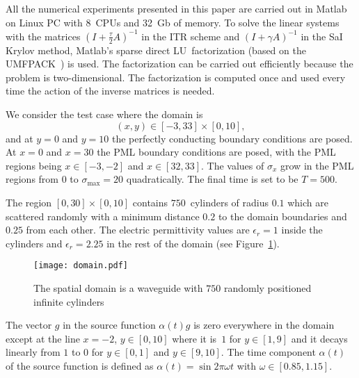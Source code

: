 \documentclass[11pt]{elsarticle}
\begin{document}
All the numerical experiments presented in this paper are carried
out in Matlab on Linux PC with 8~CPUs and 32~Gb of memory.
To solve the linear systems with the matrices $(I+\frac\tau2 A)^{-1}$
in the ITR scheme  
and $(I+\gamma A)^{-1}$ in the SaI Krylov method,
Matlab's sparse direct LU~factorization (based on the 
UMFPACK~\cite{UMFPACK2}) is used.
The factorization can be carried out efficiently because the
problem is two-dimensional.
The factorization is computed once and used every time the action
of the inverse matrices is needed.

We consider the test case where the domain is
$$
(x,y)\in [-3,33]\times [0,10],
$$
and at $y=0$ and $y=10$ the perfectly conducting
boundary conditions are posed.  At $x=0$ and $x=30$
the PML boundary conditions are posed, with the PML
regions being $x\in[-3,-2]$ and $x\in[32,33]$.
The values of $\sigma_{x}$ grow in the PML regions 
from $0$ to $\sigma_{\max}=20$ quadratically. 
The final time is set to be $T=500$.

The region $[0,30]\times [0,10]$ contains $750$~cylinders 
of radius $0.1$ which are scattered randomly with
a minimum distance $0.2$ to the domain boundaries and 
$0.25$ from each other.  The electric permittivity
values are  
$\epsilon_r=1$ inside the cylinders and $\epsilon_r=2.25$ in the rest
of the domain (see Figure~\ref{fig:dom}).

\begin{figure}
\texttt{[image: domain.pdf]}
\caption{The spatial domain is a waveguide with $750$ randomly positioned 
infinite cylinders}  
\label{fig:dom}
\end{figure}

The vector $g$ in the source function $\alpha(t)g$ is zero
everywhere in the domain except at the line $x=-2$, $y\in[0,10]$
where it is~$1$ for $y\in[1,9]$ and it decays linearly from 
$1$ to $0$ for $y\in[0,1]$ and $y\in[9,10]$.  The time component
$\alpha(t)$ of the source function is defined as 
$\alpha(t)=\sin2\pi\omega t$ with $\omega\in[0.85,1.15]$.
\end{document}
